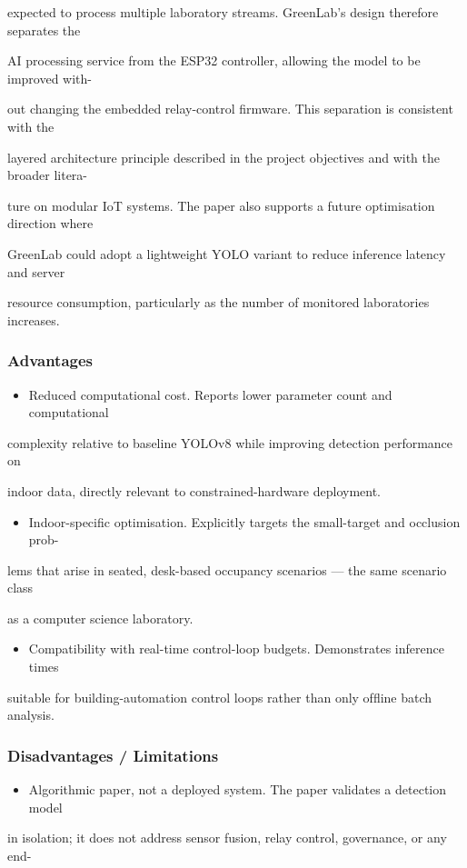 expected to process multiple laboratory streams. GreenLab's design therefore separates the

AI processing service from the ESP32 controller, allowing the model to be improved with-

out changing the embedded relay-control ﬁrmware. This separation is consistent with the

layered architecture principle described in the project objectives and with the broader litera-

ture on modular IoT systems. The paper also supports a future optimisation direction where

GreenLab could adopt a lightweight YOLO variant to reduce inference latency and server

resource consumption, particularly as the number of monitored laboratories increases.


\subsubsection*{Advantages}
\begin{itemize}
	\item Reduced computational cost. Reports lower parameter count and computational
\end{itemize}
complexity relative to baseline YOLOv8 while improving detection performance on

indoor data, directly relevant to constrained-hardware deployment.

\begin{itemize}
	\item Indoor-speciﬁc optimisation. Explicitly targets the small-target and occlusion prob-
\end{itemize}
lems that arise in seated, desk-based occupancy scenarios --- the same scenario class

as a computer science laboratory.

\begin{itemize}
	\item Compatibility with real-time control-loop budgets. Demonstrates inference times
\end{itemize}
suitable for building-automation control loops rather than only ofﬂine batch analysis.


\subsubsection*{Disadvantages / Limitations}
\begin{itemize}
	\item Algorithmic paper, not a deployed system. The paper validates a detection model
\end{itemize}
in isolation; it does not address sensor fusion, relay control, governance, or any end-

